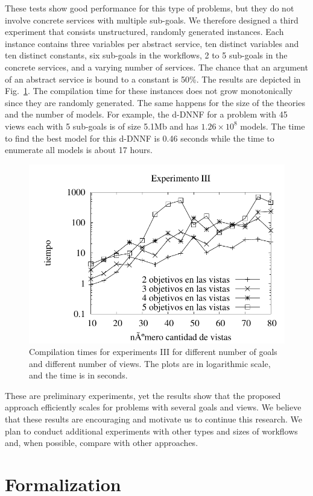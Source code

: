 \documentclass{llncs}
\begin{document}
These tests show good performance for this type of problems, but they do not
involve concrete services with multiple sub-goals. We therefore designed a
third experiment that consists unstructured, randomly generated instances.
Each instance contains three variables per abstract service, ten distinct
variables and ten distinct constants, six sub-goals in the workflows,
2 to 5 sub-goals in the concrete services, and a varying number of services.
The chance that an argument of an abstract service is bound to a constant is 50\%.
The results are depicted in Fig.~\ref{fig:plot3}.
The compilation time for these instances does not grow monotonically
since they are randomly generated. The same happens for the size of
the theories and the number of models. For example, the d-DNNF for 
a problem with 45 views each with 5 sub-goals is of size 5.1Mb and has
$1.26\times 10^8$ models. The time to find the best model for
this d-DNNF is 0.46 seconds while the time to enumerate all models
is about 17 hours.

\begin{figure}[t]
\centering
\includegraphics[width=.8\textwidth]{plots/plot3}
\caption{Compilation times for experiments III for different number of goals
and different number of views. The plots are in logarithmic scale, and the time
is in seconds.}
\label{fig:plot3}
\end{figure}

These are preliminary experiments, yet the results show that the
proposed approach efficiently scales for problems with several goals
and views. We believe that these results are encouraging and motivate
us to continue this research. We plan to conduct additional experiments
with other types and sizes of workflows and, when possible, compare with
other approaches.

\section{Formalization}
\end{document}
